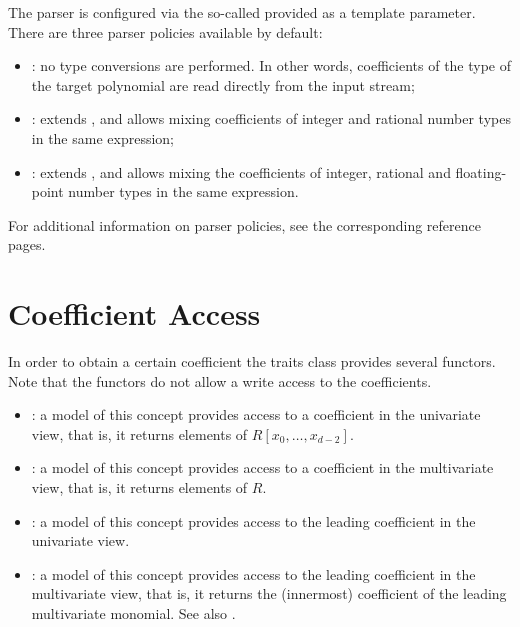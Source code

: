 The parser is configured via the so-called  provided as a template parameter.
There are three parser policies available by default:

\begin{itemize}
\item {}: no type conversions are performed. In other words, coefficients of the type
 of the target polynomial are read directly from the input stream;
\item {}: extends , and allows mixing coefficients of integer and rational number types in the same expression;
\item {}: extends , and allows mixing the coefficients of integer, rational and floating-point number types in the same expression.
\end{itemize}
For additional information on parser policies, see the corresponding reference pages.





\section{Coefficient Access}
 
In order to obtain a certain coefficient the traits class provides 
several functors. 
Note that the functors do not allow a write access to the coefficients. 
\begin{itemize}
\item {}: 
a model of this concept provides access to a coefficient in the univariate view,
that is, it returns elements of $R[x_0,\dots,x_{d-2}]$.
\item {}: 
a model of this concept provides access to a coefficient in the multivariate 
view, that is, it returns elements of $R$.
\item {}: 
a model of this concept provides access to the leading coefficient in 
the univariate view. 
\item {}: 
a model of this concept provides access to the leading coefficient in 
the multivariate view, that is,
it returns the (innermost) coefficient of the leading multivariate monomial. 
See also  .          
\end{itemize}


